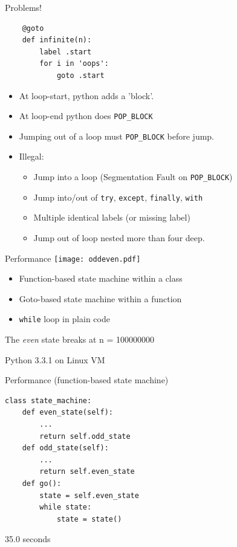 \documentclass{beamer}
\begin{document}
\begin{frame}[fragile]{Problems!}
\begin{verbatim}
    @goto
    def infinite(n):
        label .start
        for i in 'oops':
            goto .start
\end{verbatim}

\begin{itemize}
\item At loop-start, python adds a 'block'.
\item At loop-end python does \verb!POP_BLOCK!
\item Jumping out of a loop must \verb!POP_BLOCK! before jump.
\item Illegal:
\begin{itemize}
\item Jump into a loop (Segmentation Fault on \verb!POP_BLOCK!)
\item Jump into/out of \verb!try!, \verb!except!, \verb!finally!, \verb!with!
\item Multiple identical labels (or missing label)
\item Jump out of loop nested more than four deep.
\end{itemize}
\end{itemize}
\end{frame}

\begin{frame}[fragile]{Performance}
%
\texttt{[image: oddeven.pdf]}

\begin{itemize}
\item Function-based state machine within a class
\item Goto-based state machine within a function
\item \verb!while! loop in plain code
\end{itemize}

The \emph{even} state breaks at n = 100000000

Python 3.3.1 on Linux VM
\end{frame}

\begin{frame}[fragile]{Performance (function-based state machine)}

\begin{verbatim}
class state_machine:
    def even_state(self):
        ...
        return self.odd_state
    def odd_state(self):
        ...
        return self.even_state
    def go():
        state = self.even_state
        while state:
            state = state()
\end{verbatim}
\alert{35.0 seconds}
\end{frame}
\end{document}
